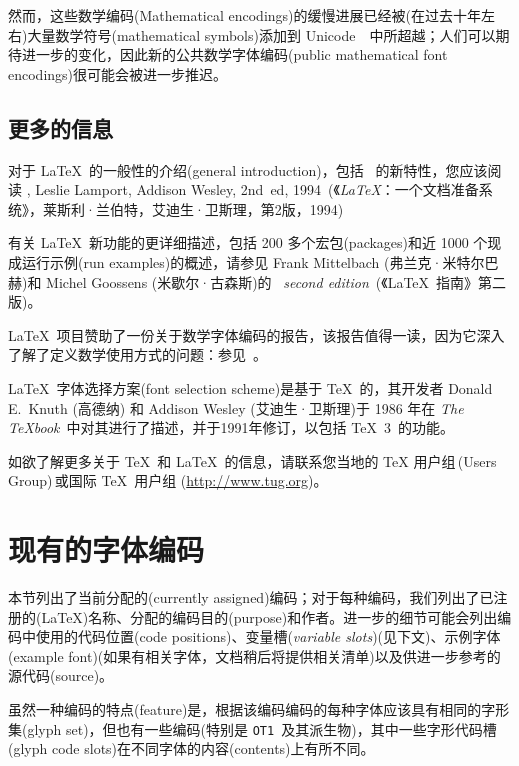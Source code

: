 \documentclass{ltxguide}[1994/11/20]
\providecommand{\Enc}[1]{\texttt{#1}}
\begin{document}
然而，这些数学编码(Mathematical encodings)的缓慢进展已经被(在过去十年左右)大量数学符号(mathematical symbols)添加到 Unicode~\cite{beeton}~中所超越；人们可以期待进一步的变化，因此新的公共数学字体编码(public mathematical font encodings)很可能会被进一步推迟。



\subsection{更多的信息}

对于 \LaTeX\ 的一般性的介绍(general introduction)，包括 \LaTeXe\ 的新特性，您应该阅读 \emph{\LaTeXbook}, Leslie Lamport, Addison Wesley, 2nd~ed, 1994\ (《\emph{\LaTeX}：一个文档准备系统》，莱斯利·兰伯特，艾迪生·卫斯理，第2版，1994)

有关 \LaTeX\ 新功能的更详细描述，包括 200 多个宏包(packages)和近 1000 个现成运行示例(run examples)的概述，请参见 Frank Mittelbach (弗兰克·米特尔巴赫)和 Michel Goossens (米歇尔·古森斯)的~\cite{A-W:MG2004} \emph{\LaTeXcomp{} second edition}\ (《\LaTeX\ 指南》第二版)。

\LaTeX{}\ 项目赞助了一份关于数学字体编码的报告，该报告值得一读，因为它深入了解了定义数学使用方式的问题：参见~\cite{ziegler,clasen,clasen-vieth}。

\LaTeX{}\ 字体选择方案(font selection scheme)是基于 \TeX\ 的，其开发者 Donald E.~Knuth (高德纳) 和 Addison Wesley (艾迪生·卫斯理)于 1986 年在 \emph{The \TeX book}\ 中对其进行了描述，并于1991年修订，以包括 \TeX~3\ 的功能。

如欲了解更多关于 \TeX{}\ 和  \LaTeX\ 的信息，请联系您当地的 \TeX{} 用户组\,(Users Group)\,或国际 \TeX{}\ 用户组 (\url{http://www.tug.org})。



\section{现有的字体编码}

本节列出了当前分配的(currently assigned)编码；对于每种编码，我们列出了已注册的(\LaTeX{})名称、分配的编码目的(purpose)和作者。进一步的细节可能会列出编码中使用的代码位置(code positions)、变量槽(\emph{variable slots})(见下文)、示例字体(example font)(如果有相关字体，文档稍后将提供相关清单)以及供进一步参考的源代码(source)。

虽然一种编码的特点(feature)是，根据该编码编码的每种字体应该具有相同的字形集(glyph set)，但也有一些编码(特别是 \Enc{OT1}\ 及其派生物)，其中一些字形代码槽(glyph code slots)在不同字体的内容(contents)上有所不同。
\end{document}
